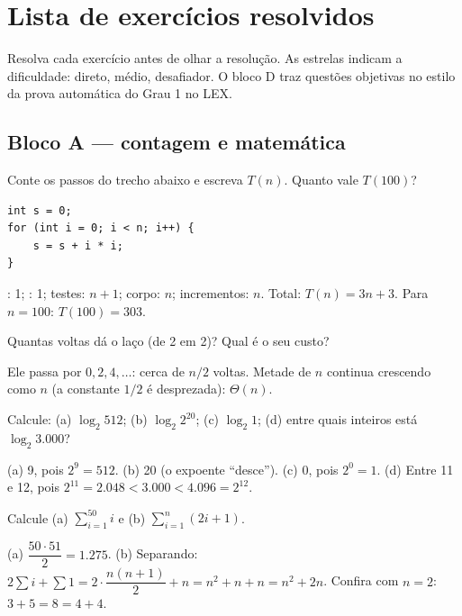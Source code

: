 \chapter{Lista de exercícios resolvidos}\label{cap:15}

Resolva cada exercício antes de olhar a resolução. As estrelas indicam a dificuldade:
{\color{edlaranja}\estrela{}} direto, {\color{edlaranja}\estrela{}\estrela{}} médio, {\color{edlaranja}\estrela{}\estrela{}\estrela{}} desafiador.
O bloco D traz questões objetivas no estilo da prova automática do Grau 1 no LEX.

\section{Bloco A — contagem e matemática}

Conte os passos do trecho abaixo e escreva $T(n)$. Quanto vale $T(100)$?
\begin{lstlisting}[style=c]
int s = 0;
for (int i = 0; i < n; i++) {
    s = s + i * i;
}
\end{lstlisting}
\begin{resolucao}
: 1; : 1; testes: $n + 1$; corpo: $n$; incrementos: $n$. Total:
$T(n) = 3n + 3$. Para $n = 100$: $T(100) = 303$.
\end{resolucao}

Quantas voltas dá o laço  (de 2 em 2)? Qual é o seu custo?
\begin{resolucao}
Ele passa por $0, 2, 4, \dots$: cerca de $n/2$ voltas. Metade de $n$ continua crescendo como $n$
(a constante $1/2$ é desprezada): $\Theta(n)$.
\end{resolucao}

Calcule: (a) $\log_2 512$; (b) $\log_2 2^{20}$; (c) $\log_2 1$; (d) entre quais inteiros está $\log_2 3.000$?
\begin{resolucao}
(a) 9, pois $2^9 = 512$. (b) 20 (o expoente \enquote{desce}). (c) 0, pois $2^0 = 1$.
(d) Entre 11 e 12, pois $2^{11} = 2.048 < 3.000 < 4.096 = 2^{12}$.
\end{resolucao}

Calcule (a) $\displaystyle\sum_{i=1}^{50} i$ \quad e \quad (b) $\displaystyle\sum_{i=1}^{n} (2i + 1)$.
\begin{resolucao}
(a) $\dfrac{50 \cdot 51}{2} = 1.275$. (b) Separando: $2 \sum i + \sum 1 = 2 \cdot \dfrac{n(n+1)}{2} + n
= n^2 + n + n = n^2 + 2n$. Confira com $n = 2$: $3 + 5 = 8 = 4 + 4$.
\end{resolucao}

